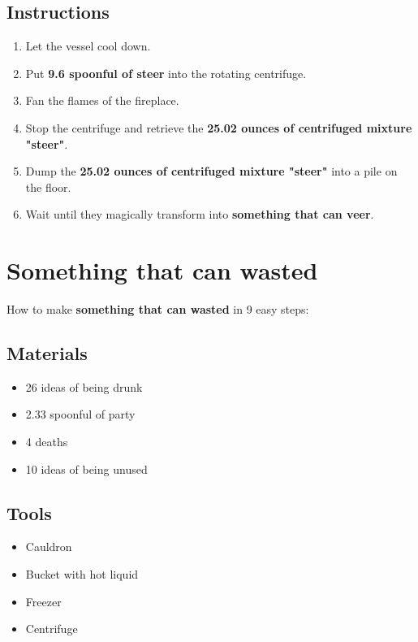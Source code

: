 \documentclass{article}
\begin{document}
\subsection{Instructions}\begin{enumerate}
\item 
Let the vessel cool down.
\item 
Put \textbf{9.6 spoonful of steer} into the rotating centrifuge.
\item 
Fan the flames of the fireplace.
\item 
Stop the centrifuge and retrieve the \textbf{25.02 ounces of centrifuged mixture "steer"}.
\item 
Dump the \textbf{25.02 ounces of centrifuged mixture "steer"} into a pile on the floor.
\item 
Wait until they magically transform into \textbf{something that can veer}.
\end{enumerate}
\newpage
\section{Something that can wasted}How to make \textbf{something that can wasted} in 9 easy steps:

\subsection{Materials}\begin{itemize}
\item 
26 ideas of being drunk
\item 
2.33 spoonful of party
\item 
4 deaths
\item 
10 ideas of being unused
\end{itemize}
\subsection{Tools}\begin{itemize}
\item 
Cauldron
\item 
Bucket with hot liquid
\item 
Freezer
\item 
Centrifuge
\end{itemize}
\end{document}
